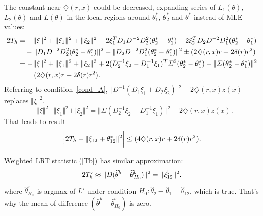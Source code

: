 \begin{remark}
 The constant near  $\diamondsuit (r, x)$ could be decreased,  expanding  series of $L_1(\theta)$, $L_2(\theta)$ and $L(\theta)$ in the local regions around $\theta_1^*$, $\theta_2^*$ and $\theta^*$ instead of MLE values:
\begin{align*}
2 T_h &= - \Vert \xi \Vert^2 + \Vert \xi_1 \Vert^2 + \Vert \xi_2 \Vert^2  
-2 \xi_1^T D_1 D^{-2} D_2^2 (\theta_2^* - \theta_1^*) 
+ 2 \xi_2^T D_2 D^{-2} D_1^2 (\theta_2^* - \theta_1^*) \\
&\quad+ \Vert  D_1 D^{-2} D_2^2 (\theta_2^* - \theta_1^* )\Vert^2 + \Vert  D_2 D^{-2} D_1^2 (\theta_2^* - \theta_1^*) \Vert^2 
\pm (2 \diamondsuit (r, x) r + 2 \delta(r) r^2) \\
&= - \Vert \xi \Vert^2 + \Vert \xi_1 \Vert^2 + \Vert \xi_2 \Vert^2   
+2(D_2^{-1} \xi_2 - D_1^{-1} \xi_1)^T \varSigma^2 (\theta_2^* - \theta_1^*) + \Vert \varSigma (\theta_2^* - \theta_1^*) \Vert^2 \\
&\quad\pm (2 \diamondsuit (r, x) r + 2 \delta(r) r^2).
\end{align*}
Referring to condition~\ref{cond_A}, $\Vert D^{-1}(D_1 \xi_1 + D_2 \xi_2) \Vert^2 \pm  2\diamondsuit (r, x) z(x) $ replaces $\Vert \xi \Vert^2$. 
\[
- \Vert \xi \Vert^2 + \Vert \xi_1 \Vert^2 + \Vert \xi_2 \Vert^2  
=\Vert \Sigma (D_2^{-1} \xi_2 - D_1^{-1} \xi_1) \Vert^2 \pm  2\diamondsuit (r, x) z(x).
\]
That leads to result
\[
\bigg |
2 T_h  -  \Vert  \xi_{12} +  \theta_{12}^* \Vert^2 
\bigg | 
\leq (4 \diamondsuit (r, x) r + 2 \delta(r) r^2).
\]
\end{remark}

\begin{remark}
Weighted LRT statistic (\ref{Tb}) has  similar approximation:
\[
2 T_h^{\flat} \approx  \Vert D(\widehat{\theta}^b - \widehat{\theta}_{H_0}^b)  \Vert^2 =  \Vert \xi_{12}^{\flat}  \Vert^2.
\] 
where $\widehat{\theta}^{\flat}_{H_0}$ is argmax of $L^{\flat}$ under condition $H_0: \widehat{\theta}_2 - \widehat{\theta}_1 = \widehat{\theta}_{12}$, which is true. That's why the mean of difference $(\widehat{\theta}^b - \widehat{\theta}_{H_0}^b)$  is zero.
\end{remark}

